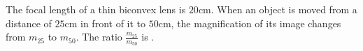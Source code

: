 
\item The focal length of a thin biconvex lens is \(20\text{cm}\). When an object is moved from a distance of \(25\text{cm}\) in front of it to \(50\text{cm}\), the magnification of its image changes from \(m_{25}\) to \(m_{50}\). The ratio \(\frac{m_{25}}{m_{50}}\) is \underline{\hspace{2.5cm}}.
